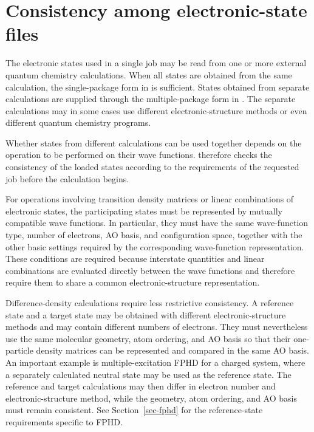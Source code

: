 \section{Consistency among electronic-state files}
\label{sec-reading}

The electronic states used in a single \progname{} job may be read from one or more external quantum chemistry calculations. When all states are obtained from the same calculation, the single-package form in  is sufficient. States obtained from separate calculations are supplied through the multiple-package form in . The separate calculations may in some cases use different electronic-structure methods or even different quantum chemistry programs.

Whether states from different calculations can be used together depends on the operation to be performed on their wave functions. \progname{} therefore checks the consistency of the loaded states according to the requirements of the requested job before the calculation begins.

For operations involving transition density matrices or linear combinations of electronic states, the participating states must be represented by mutually compatible wave functions. In particular, they must have the same wave-function type, number of electrons, AO basis, and configuration space, together with the other basic settings required by the corresponding wave-function representation. These conditions are required because interstate quantities and linear combinations are evaluated directly between the wave functions and therefore require them to share a common electronic-structure representation.

Difference-density calculations require less restrictive consistency. A reference state and a target state may be obtained with different electronic-structure methods and may contain different numbers of electrons. They must nevertheless use the same molecular geometry, atom ordering, and AO basis so that their one-particle density matrices can be represented and compared in the same AO basis. An important example is multiple-excitation FPHD for a charged system, where a separately calculated neutral state may be used as the reference state. The reference and target calculations may then differ in electron number and electronic-structure method, while the geometry, atom ordering, and AO basis must remain consistent. See Section~\ref{sec-fphd} for the reference-state requirements specific to FPHD.

